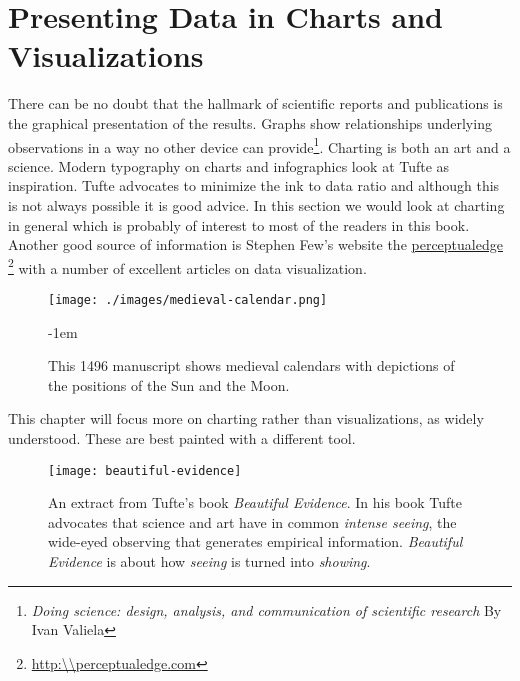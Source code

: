 \let\luacmd\textbf
\chapter[Charts and Visualizations]{Presenting Data in Charts and Visualizations}
\label{ch:charts}
\pagestyle{headings}

There can be no doubt that the hallmark of scientific reports and publications is the graphical presentation of the results. Graphs show relationships underlying observations in a way no other device can provide\footnote{\textit{Doing science: design, analysis, and communication of scientific research}
 By Ivan Valiela}.  Charting is both an art and a science. Modern typography on charts and infographics look at Tufte as inspiration.
Tufte advocates to minimize the ink to data ratio and although this is not always possible it is good advice.
In this section we would look at charting in general which is probably of interest to most of the readers
in this book.  Another good source of information is Stephen Few’s website the \href{perpetualedge}{perceptualedge} \footnote{\protect\url{http:\\perceptualedge.com}}  with a number of excellent articles on data visualization. 




\begin{figure}[htbp]
\parindent=0pt
\centering

\texttt{[image: ./images/medieval-calendar.png]}

\parindent-1em
\noindent\caption{This 1496 manuscript shows medieval calendars with depictions of the positions of the Sun and the Moon.}

\end{figure}

This chapter will focus more on charting rather than visualizations, as widely understood. These are best painted with a different tool. 

\begin{figure}[htbp]
\parindent=0pt


\texttt{[image: beautiful-evidence]}

\caption{An extract from Tufte’s book \textit{Beautiful Evidence}. In his book Tufte advocates that science and art have in common \emph{intense seeing}, the wide-eyed observing that generates empirical information. \textit{Beautiful Evidence} is about how \emph{seeing} is turned into \emph{showing}. \cite{Tufte2006}}
\end{figure}

